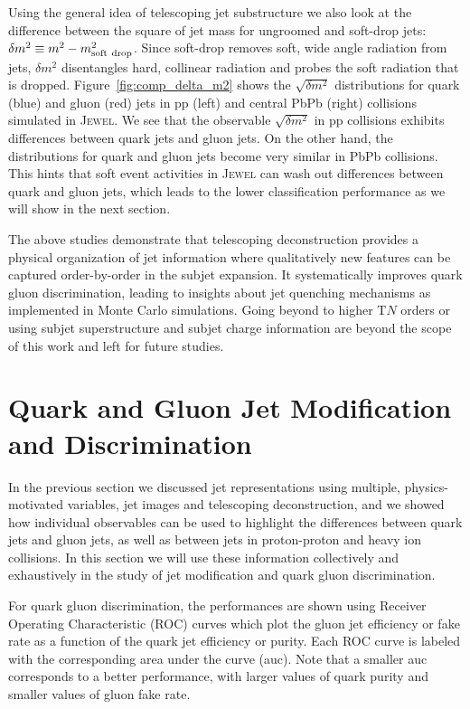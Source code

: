 \documentclass[notoc]{JHEP3}
\begin{document}
Using the general idea of telescoping jet substructure \cite{Chien:2017xrb} we also look at the difference between the square of jet mass for ungroomed and soft-drop jets: $\delta m^2 \equiv m^2-m^2_{\rm soft~drop}$. Since soft-drop removes soft, wide angle radiation from jets, $\delta m^2$ disentangles hard, collinear radiation and probes the soft radiation that is dropped. Figure~\ref{fig:comp_delta_m2} shows the $\sqrt{\delta m^2}$ distributions for quark (blue) and gluon (red) jets in pp (left) and central PbPb (right) collisions simulated in \textsc{Jewel}. We see that the observable $\sqrt{\delta m^2}$ in pp collisions exhibits differences between quark jets and gluon jets. On the other hand, the distributions for quark and gluon jets become very similar in PbPb collisions. This hints that soft event activities in \textsc{Jewel} can wash out differences between quark and gluon jets, which leads to the lower classification performance as we will show in the next section.

The above studies demonstrate that telescoping deconstruction provides a physical organization of jet information where qualitatively new features can be captured order-by-order in the subjet expansion. It systematically improves quark gluon discrimination, leading to insights about jet quenching mechanisms as implemented in Monte Carlo simulations. Going beyond to higher T$N$ orders or using subjet superstructure \cite{Gallicchio:2010sw} and subjet charge \cite{Krohn:2012fg} information are beyond the scope of this work and left for future studies.

\section{Quark and Gluon Jet Modification and Discrimination}
\label{sec:results}

In the previous section we discussed jet representations using multiple, physics-motivated variables, jet images and telescoping deconstruction, and we showed how individual observables can be used to highlight the differences between quark jets and gluon jets, as well as between jets in proton-proton and heavy ion collisions. In this section we will use these information collectively and exhaustively in the study of jet modification and quark gluon discrimination.

For quark gluon discrimination, the performances are shown using Receiver Operating Characteristic (ROC) curves which plot the gluon jet efficiency or fake rate as a function of the quark jet efficiency or purity. Each ROC curve is labeled with the corresponding area under the curve (auc). Note that a smaller auc corresponds to a better performance, with larger values of quark purity and smaller values of gluon fake rate.
\end{document}
